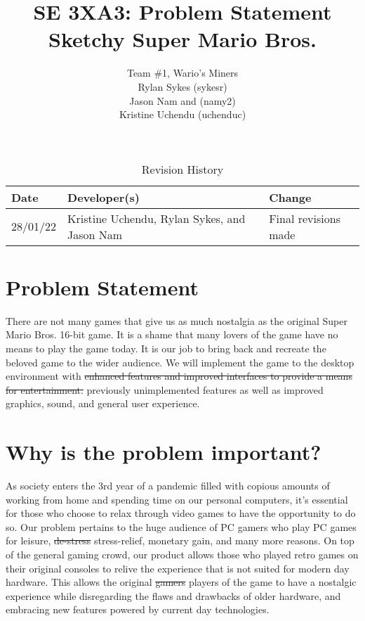 \documentclass{article}
\title{SE 3XA3: Problem Statement\\Sketchy Super Mario Bros.}
\author{Team \#1, Wario's Miners
		\\ Rylan Sykes (sykesr)
		\\ Jason Nam and (namy2)
		\\ Kristine Uchendu (uchenduc)
}
\date{}
\begin{document}
\begin{table}[hp]
\caption{Revision History} \label{TblRevisionHistory}
\begin{tabularx}{\textwidth}{llX}
\toprule
\textbf{Date} & \textbf{Developer(s)} & \textbf{Change}\\
\midrule
28/01/22 & Kristine Uchendu, Rylan Sykes, and Jason Nam & Final revisions made\\
\bottomrule
\end{tabularx}
\end{table}

\newpage

\maketitle

\section{Problem Statement}
    There are not many games that give us as much nostalgia as the original Super Mario Bros. 16-bit game. It is a shame that many lovers of the game have no means to play the game today. It is our job to bring back and recreate the beloved game to the wider audience. We will implement the game to the desktop environment with {\color{red}\sout{enhanced features and improved interfaces to provide a means for entertainment.} previously unimplemented features as well as improved graphics, sound, and general user experience.}

\section{Why is the problem important?}
    As society enters the 3rd year of a pandemic filled with copious amounts of working from home and spending time on our personal computers, it’s essential for those who choose to relax through video games to have the opportunity to do so. Our problem pertains to the huge audience of PC gamers who play PC games for leisure,  {\color{red}\sout{de-stress} stress-relief}, monetary gain, and many more reasons. On top of the general gaming crowd, our product allows those who played retro games on their original consoles to relive the experience that is not suited for modern day hardware. This allows the original  {\color{red}\sout{gamers} players of the game} to have a nostalgic experience while disregarding the flaws and drawbacks of older hardware, and embracing new features powered by current day technologies.
\end{document}
